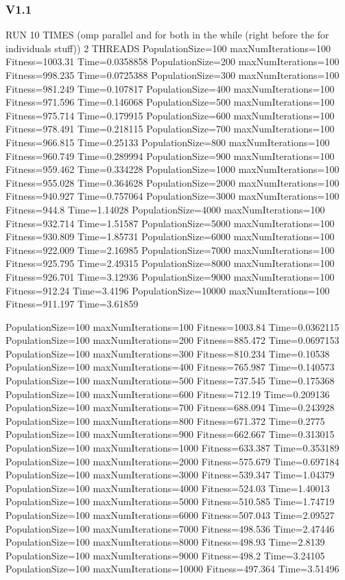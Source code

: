 \documentclass[10pt,letterpaper]{article}
\begin{document}
\subsubsection{V1.1}
RUN 10 TIMES (omp parallel and for both in the while (right before the for individuals stuff)) 2 THREADS
PopulationSize=100 maxNumIterations=100 Fitness=1003.31 Time=0.0358858
PopulationSize=200 maxNumIterations=100 Fitness=998.235 Time=0.0725388
PopulationSize=300 maxNumIterations=100 Fitness=981.249 Time=0.107817
PopulationSize=400 maxNumIterations=100 Fitness=971.596 Time=0.146068
PopulationSize=500 maxNumIterations=100 Fitness=975.714 Time=0.179915
PopulationSize=600 maxNumIterations=100 Fitness=978.491 Time=0.218115
PopulationSize=700 maxNumIterations=100 Fitness=966.815 Time=0.25133
PopulationSize=800 maxNumIterations=100 Fitness=960.749 Time=0.289994
PopulationSize=900 maxNumIterations=100 Fitness=959.462 Time=0.334228
PopulationSize=1000 maxNumIterations=100 Fitness=955.028 Time=0.364628
PopulationSize=2000 maxNumIterations=100 Fitness=940.927 Time=0.757064
PopulationSize=3000 maxNumIterations=100 Fitness=944.8 Time=1.14028
PopulationSize=4000 maxNumIterations=100 Fitness=932.714 Time=1.51587
PopulationSize=5000 maxNumIterations=100 Fitness=930.809 Time=1.85731
PopulationSize=6000 maxNumIterations=100 Fitness=922.009 Time=2.16985
PopulationSize=7000 maxNumIterations=100 Fitness=925.795 Time=2.49315
PopulationSize=8000 maxNumIterations=100 Fitness=926.701 Time=3.12936
PopulationSize=9000 maxNumIterations=100 Fitness=912.24 Time=3.4196
PopulationSize=10000 maxNumIterations=100 Fitness=911.197 Time=3.61859

PopulationSize=100 maxNumIterations=100 Fitness=1003.84 Time=0.0362115
PopulationSize=100 maxNumIterations=200 Fitness=885.472 Time=0.0697153
PopulationSize=100 maxNumIterations=300 Fitness=810.234 Time=0.10538
PopulationSize=100 maxNumIterations=400 Fitness=765.987 Time=0.140573
PopulationSize=100 maxNumIterations=500 Fitness=737.545 Time=0.175368
PopulationSize=100 maxNumIterations=600 Fitness=712.19 Time=0.209136
PopulationSize=100 maxNumIterations=700 Fitness=688.094 Time=0.243928
PopulationSize=100 maxNumIterations=800 Fitness=671.372 Time=0.2775
PopulationSize=100 maxNumIterations=900 Fitness=662.667 Time=0.313015
PopulationSize=100 maxNumIterations=1000 Fitness=633.387 Time=0.353189
PopulationSize=100 maxNumIterations=2000 Fitness=575.679 Time=0.697184
PopulationSize=100 maxNumIterations=3000 Fitness=539.347 Time=1.04379
PopulationSize=100 maxNumIterations=4000 Fitness=524.03 Time=1.40013
PopulationSize=100 maxNumIterations=5000 Fitness=510.585 Time=1.74719
PopulationSize=100 maxNumIterations=6000 Fitness=507.043 Time=2.09527
PopulationSize=100 maxNumIterations=7000 Fitness=498.536 Time=2.47446
PopulationSize=100 maxNumIterations=8000 Fitness=498.93 Time=2.8139
PopulationSize=100 maxNumIterations=9000 Fitness=498.2 Time=3.24105
PopulationSize=100 maxNumIterations=10000 Fitness=497.364 Time=3.51496
\end{document}
